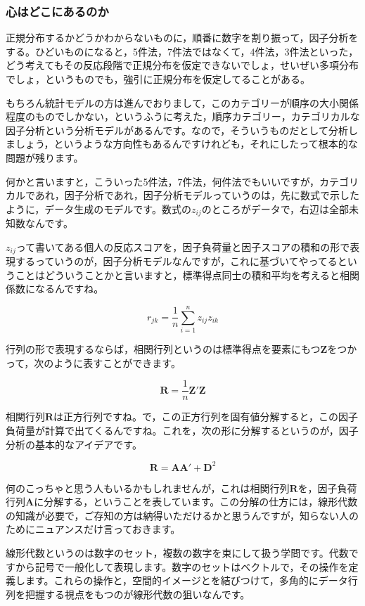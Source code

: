 \documentclass{ltjsbook}
\begin{document}
\subsubsection{心はどこにあるのか}

正規分布するかどうかわからないものに，順番に数字を割り振って，因子分析をする。ひどいものになると，5件法，7件法ではなくて，4件法，3件法といった，どう考えてもその反応段階で正規分布を仮定できないでしょ，せいぜい多項分布でしょ，というものでも，強引に正規分布を仮定してることがある。

もちろん統計モデルの方は進んでおりまして，このカテゴリーが順序の大小関係程度のものでしかない，というふうに考えた，順序カテゴリー，カテゴリカルな因子分析という分析モデルがあるんです。なので，そういうものだとして分析しましょう，というような方向性もあるんですけれども，それにしたって根本的な問題が残ります。

何かと言いますと，こういった5件法，7件法，何件法でもいいですが，カテゴリカルであれ，因子分析であれ，因子分析モデルっていうのは，先に数式で示したように，データ生成のモデルです。数式の$z_{ij}$のところがデータで，右辺は全部未知数なんです。

$z_{ij}$って書いてある個人の反応スコアを，因子負荷量と因子スコアの積和の形で表現するっていうのが，因子分析モデルなんですが，これに基づいてやってるということはどういうことかと言いますと，標準得点同士の積和平均を考えると相関係数になるんですね。

\[ r_{jk} = \frac{1}{n}\sum_{i=1}^n z_{ij}z_{ik} \]

行列の形で表現するならば，相関行列というのは標準得点を要素にもつ$\bm{Z}$をつかって，次のように表すことができます。

\[ \bm{R} = \frac{1}{n}\bm{Z}'\bm{Z} \]

相関行列$\bm{R}$は正方行列ですね。で，この正方行列を固有値分解すると，この因子負荷量が計算で出てくるんですね。これを，次の形に分解するというのが，因子分析の基本的なアイデアです。

\[ \bm{R} = \bm{AA}' + \bm{D}^2 \]

何のこっちゃと思う人もいるかもしれませんが，これは相関行列$\bm{R}$を，因子負荷行列$\bm{A}$に分解する，ということを表しています。この分解の仕方には，線形代数の知識が必要で，ご存知の方は納得いただけるかと思うんですが，知らない人のためにニュアンスだけ言っておきます。

線形代数というのは数字のセット，複数の数字を束にして扱う学問です。代数ですから記号で一般化して表現します。数字のセットはベクトルで，その操作を定義します。これらの操作と，空間的イメージとを結びつけて，多角的にデータ行列を把握する視点をもつのが線形代数の狙いなんです。
\end{document}

